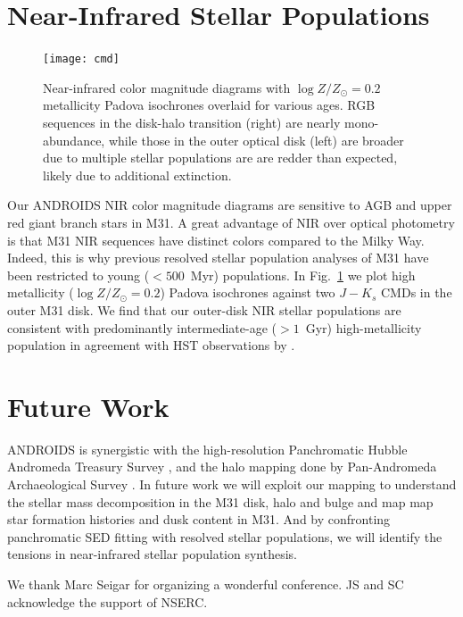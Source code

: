 \documentclass[11pt,twoside]{article}
\begin{document}
\section{Near-Infrared Stellar Populations}

\begin{figure}[t]
\centering
\texttt{[image: cmd]}
\caption{Near-infrared color magnitude diagrams with $\log Z/Z_\odot=0.2$ metallicity Padova isochrones overlaid for various ages.
RGB sequences in the disk-halo transition (right) are nearly mono-abundance, while those in the outer optical disk (left) are broader due to multiple stellar populations are are redder than expected, likely due to additional extinction.}
\label{fig:cmd}
\end{figure}

Our ANDROIDS NIR color magnitude diagrams are sensitive to AGB and upper red giant branch stars in M31.
A great advantage of NIR over optical photometry is that M31 NIR sequences have distinct colors compared to the Milky Way.
Indeed, this is why previous resolved stellar population analyses of M31 \citep[e.g.,][]{Williams:2003} have been restricted to young ($<500$~Myr) populations.
In Fig.~\ref{fig:cmd} we plot high metallicity ($\log Z/Z_\odot = 0.2$) Padova isochrones \citep{Marigo:2008} against two $J-K_s$ CMDs in the outer M31 disk.
We find that our outer-disk NIR stellar populations are consistent with predominantly intermediate-age ($>1$~Gyr) high-metallicity population in agreement with HST observations by \cite{Brown:2006}.

\section{Future Work}

ANDROIDS is synergistic with the high-resolution Panchromatic Hubble Andromeda Treasury Survey \citep{Dalcanton:2012}, and the halo mapping done by Pan-Andromeda Archaeological Survey \citep{McConnachie:2009}.
In future work we will exploit our mapping to understand the stellar mass decomposition in the M31 disk, halo and bulge and map map star formation histories and dusk content in M31.
And by confronting panchromatic SED fitting with resolved stellar populations, we will identify the tensions in near-infrared stellar population synthesis.

\acknowledgements We thank Marc Seigar for organizing a wonderful conference. JS and SC acknowledge the support of NSERC.


\end{document}

